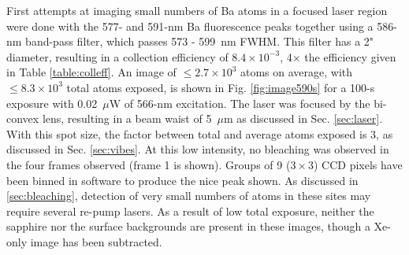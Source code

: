 First attempts at imaging small numbers of Ba atoms in a focused laser region were done with the 577- and 591-nm Ba fluorescence peaks together using a 586-nm band-pass filter, which passes 573 - 599~nm FWHM.  This filter has a 2" diameter, resulting in a collection efficiency of $8.4 \times 10^{-3}$, 4$\times$ the efficiency given in Table \ref{table:colleff}.  An image of $\leq 2.7 \times 10^{3}$ atoms on average, with $\leq 8.3 \times 10^{3}$ total atoms exposed, is shown in Fig. \ref{fig:image590s} for a 100-s exposure with 0.02~$\mu$W of 566-nm excitation.  The laser was focused by the bi-convex lens, resulting in a beam waist of 5~$\mu$m as discussed in Sec. \ref{sec:laser}.  With this spot size, the factor between total and average atoms exposed is 3, as discussed in Sec. \ref{sec:vibes}.  At this low intensity, no bleaching was observed in the four frames observed (frame 1 is shown).  Groups of 9 ($3 \times 3$) CCD pixels have been binned in software to produce the nice peak shown.  As discussed in \ref{sec:bleaching}, detection of very small numbers of atoms in these sites may require several re-pump lasers.  As a result of low total exposure, neither the sapphire nor the surface backgrounds are present in these images, though a Xe-only image has been subtracted. 




